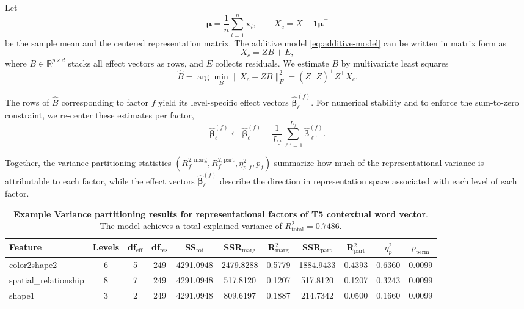 \documentclass[10pt,twocolumn,letterpaper]{article}
\begin{document}
Let
\begin{equation}
    \boldsymbol{\mu} = \frac{1}{n} \sum_{i=1}^n \mathbf{x}_i, \qquad
    X_c = X - \mathbf{1}\boldsymbol{\mu}^\top
\end{equation}
be the sample mean and the centered representation matrix. The additive model
\eqref{eq:additive-model} can be written in matrix form as
\begin{equation}
    X_c = Z B + E,
\end{equation}
where $B \in \mathbb{R}^{p \times d}$ stacks all effect vectors as rows, and $E$ collects residuals. We estimate $B$ by multivariate least squares
\begin{equation}
    \hat{B} = \arg\min_{B} \lVert X_c - Z B \rVert_F^2
    = (Z^\top Z)^+ Z^\top X_c.
\end{equation}

The rows of $\hat{B}$ corresponding to factor $f$ yield its level-specific effect vectors
$\hat{\boldsymbol{\beta}}^{(f)}_\ell$. For numerical stability and to enforce the sum-to-zero constraint, we re-center these estimates per factor,
\begin{equation}
    \hat{\boldsymbol{\beta}}^{(f)}_\ell \leftarrow 
    \hat{\boldsymbol{\beta}}^{(f)}_\ell
    - \frac{1}{L_f} \sum_{\ell'=1}^{L_f} \hat{\boldsymbol{\beta}}^{(f)}_{\ell'}.
\end{equation}

Together, the variance-partitioning statistics $(R_f^{2,\text{marg}}, R_f^{2,\text{part}}, \eta_{p,f}^2, p_f)$ summarize how much of the representational variance is attributable to each factor, while the effect vectors $\hat{\boldsymbol{\beta}}^{(f)}_\ell$ describe the direction in representation space associated with each level of each factor.

\begin{table}[t]
\centering
\caption{\textbf{Example Variance partitioning results for representational factors of T5 contextual word vector}. 
The model achieves a total explained variance of $R^2_{\text{total}} = 0.7486$.}
\label{tab:varpart}
\begin{tabular}{lcccccccccc}
\toprule
\textbf{Feature} & \textbf{Levels} & \textbf{df$_\text{eff}$} & \textbf{df$_\text{res}$} &
\textbf{SS$_\text{tot}$} & \textbf{SSR$_\text{marg}$} & \textbf{R$^2_\text{marg}$} &
\textbf{SSR$_\text{part}$} & \textbf{R$^2_\text{part}$} & \boldmath$\eta^2_p$ &
$p_\text{perm}$ \\
\midrule
color2shape2          & 6 & 5 & 249 & 4291.0948 & 2479.8288 & 0.5779 & 1884.9433 & 0.4393 & 0.6360 & 0.0099 \\
spatial\_relationship & 8 & 7 & 249 & 4291.0948 &  517.8120 & 0.1207 &  517.8120 & 0.1207 & 0.3243 & 0.0099 \\
shape1                & 3 & 2 & 249 & 4291.0948 &  809.6197 & 0.1887 &  214.7342 & 0.0500 & 0.1660 & 0.0099 \\
\bottomrule
\end{tabular}
\end{table}
\end{document}

